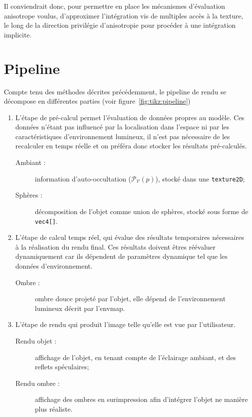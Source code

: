 \documentclass[10pt,a4paper,twoside, twocolumn]{report}
\newcommand*{\rootPath}{../}
\begin{document}
Il conviendrait donc, pour permettre en place les mécanismes d'évaluation anisotrope voulus, d'approximer l’intégration vis de multiples accès à la texture, le long de la direction privilégie d’anisotropie pour procéder à une intégration implicite.


\section{Pipeline}

\begin{figure*}[ht!]
	\centering
	
	\caption{Pipeline développé}
	\label{fig:tikz:pipeline}
\end{figure*}

Compte tenu des méthodes décrites précédemment, le pipeline de rendu se décompose en différentes parties (voir figure~\ref{fig:tikz:pipeline})
\begin{enumerate}
	\item L'étape de pré-calcul permet l'évaluation de données propres au modèle. Ces données n'étant pas influencé par la localisation dans l'espace ni par les caractéristiques d'environnement lumineux, il n'est pas nécessaire de les recalculer en temps réelle et on préféra donc stocker les résultats pré-calculés.
		\begin{description}
			\item[Ambiant :] information d'auto-occultation ($\mathcal P_{\mathcal V}(p)$), stocké dans une \texttt{texture2D};
			\item[Sphères :] décomposition de l'objet comme union de sphères, stocké sous forme de \texttt{vec4[]}.
		\end{description}

	\item L'étape de calcul temps réel, qui évalue des résultats temporaires nécessaires à la réalisation du rendu final. Ces résultats doivent êtres réévaluer dynamiquement car ils dépendent de paramètres dynamique tel que les données d'environnement.
		\begin{description}
			\item[Ombre :] ombre douce projeté par l'objet, elle dépend de l'environnement lumineux décrit par l'envmap.
		\end{description}
	
	\item L'étape de rendu qui produit l'image telle qu'elle est vue par l'utilisateur.
		\begin{description}
			\item[Rendu objet :] affichage de l'objet, en tenant compte de l'éclairage ambiant, et des reflets spéculaires;
			\item[Rendu ombre :] affichage des ombres en surimpression afin d'intégrer l'objet ne manière plus réaliste.
		\end{description}
\end{enumerate}
\end{document}
